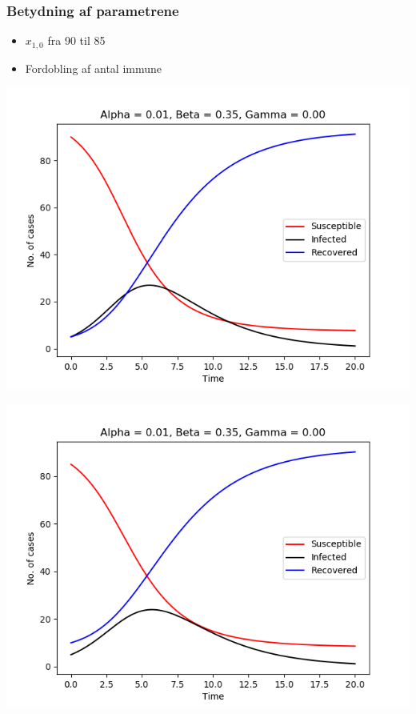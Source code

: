 \begin{frame}
\frametitle{Betydning af parametrene}
\begin{itemize}
\item $x_{1,0}$ fra 90 til 85
\item Fordobling af antal immune
\end{itemize}

\begin{minipage}{0.49\textwidth}
\includegraphics[scale=0.3]{fig/img/t_a1_b35_g0.png}
\end{minipage}
%
\begin{minipage}{0.49\textwidth}
\includegraphics[scale=0.3]{fig/img/t_x1_5_x2_85.png}
\end{minipage}
\end{frame}

